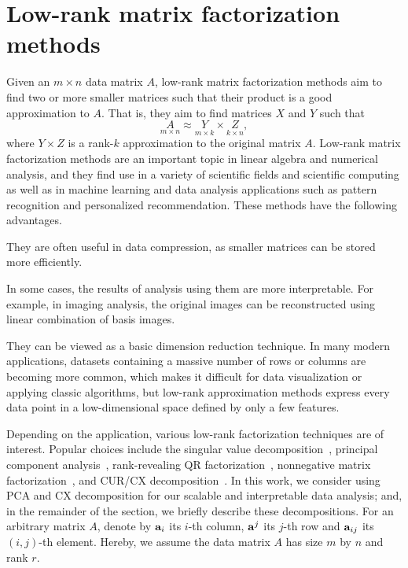 \section{Low-rank matrix factorization methods}
\label{sxn:low-rank-methods}

Given an $m \times n$ data matrix $A$, low-rank matrix factorization methods aim to find two or more smaller matrices such that their product is a good approximation to $A$.
That is, they aim to find matrices $X$ and $Y$ such that
\begin{equation}
 \label{eqn:apprx}
    \underset{m\times n}{A} \approx \underset{m\times k}{Y} \times \underset{k\times n}{Z} , 
\end{equation}
where $Y \times Z$ is a rank-$k$ approximation to the original matrix $A$.
Low-rank matrix factorization methods are an important topic in linear algebra and numerical analysis, and they find use in a variety of scientific fields and scientific computing as well as in machine learning and data analysis applications such as pattern recognition and personalized recommendation.
These methods have the following advantages.
\begin{compactitem}
\item
They are often useful in data compression, as smaller matrices can be stored more efficiently.
\item
In some cases, the results of analysis using them are more interpretable.
For example, in imaging analysis, the original images can be reconstructed using linear combination of basis images.
\item
They can be viewed as a basic dimension reduction technique.
In many modern applications, datasets containing a massive number of rows or columns are becoming more common, which makes it difficult for data visualization or applying classic algorithms, but low-rank approximation methods express every data point in a low-dimensional space defined by only a few features.
\end{compactitem}

Depending on the application, various low-rank factorization techniques are of interest. 
Popular choices include the singular value decomposition~\cite{GVL96}, principal component analysis~\cite{pcaBook}, rank-revealing QR factorization~\cite{GE96}, nonnegative matrix factorization~\cite{NMFalg}, and CUR/CX decomposition~\cite{CUR_PNAS}.
In this work, we consider using PCA and CX decomposition for our scalable and interpretable data analysis; and, in the remainder of the section, we briefly describe these decompositions.
For an arbitrary matrix $A$, denote by $\mathbf{a}_i$ its $i$-th column, $\mathbf{a}^j$ its $j$-th row and $\mathbf{a}_{ij}$ its $(i,j)$-th element. 
Hereby, we assume the data matrix $A$ has size $m$ by $n$ and rank $r$.


